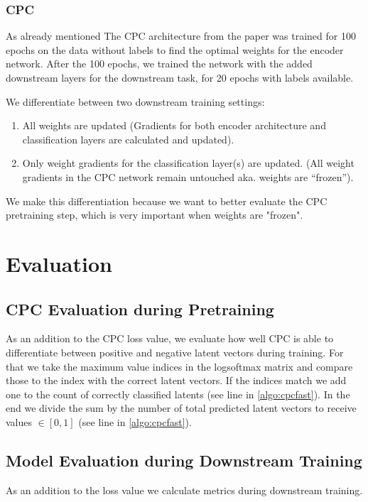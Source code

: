\subsubsection{CPC} 
As already mentioned The CPC architecture from the paper was trained for 100 epochs on the data without labels to find the optimal weights for the encoder network. 
After the 100 epochs, we trained the network with the added downstream layers for the downstream task, for 20 epochs with labels available.

We differentiate between two downstream training settings:
\begin{enumerate}
	\item All weights are updated (Gradients for both encoder architecture and classification layers are calculated and updated).
	\item Only weight gradients for the classification layer(s) are updated. (All weight gradients in the CPC network remain untouched aka. weights are \enquote{frozen}).
\end{enumerate}
We make this differentiation because we want to better evaluate the CPC pretraining step, which is very important when weights are "frozen".


\section{Evaluation}

\subsection{CPC Evaluation during Pretraining}
As an addition to the CPC loss value, we evaluate how well CPC is able to differentiate between positive and negative latent vectors during training. For that we take the maximum value indices in the logsoftmax matrix and compare those to the index with the correct latent vectors. If the indices match we add one to the count of correctly classified latents (see line  in \autoref{algo:cpcfast}). In the end we divide the sum by the number of total predicted latent vectors to receive values $\in [0,1]$ (see line  in \autoref{algo:cpcfast}).


\subsection{Model Evaluation during Downstream Training}
As an addition to the loss value we calculate metrics during downstream training.

